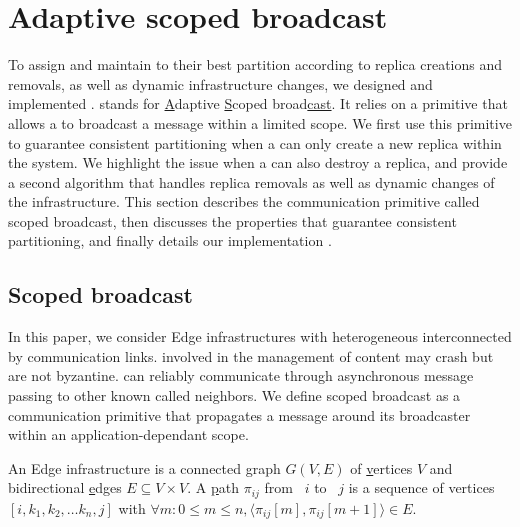 
\section{Adaptive scoped broadcast}
\label{sec:adaptive}

To assign and maintain \processes to their best partition according to
replica creations and removals, as well as dynamic infrastructure
changes, we designed and implemented \NAME.  \NAME stands for
\underline{A}daptive \underline{S}coped broad\underline{cast}. It
relies on a primitive that allows a \process to broadcast a message
within a limited scope. We first use this primitive to guarantee
consistent partitioning when a \process can only create a new replica
within the system. We highlight the issue when a \process can also
destroy a replica, and provide a second algorithm that handles replica
removals as well as dynamic changes of the infrastructure.  This
section describes the communication primitive called scoped broadcast,
then discusses the properties that guarantee consistent partitioning,
and finally details our implementation \NAME.


\subsection{Scoped broadcast}
\label{subsec:scoped}

%

In this paper, we consider Edge infrastructures with heterogeneous
\nodes interconnected by communication links. \Processes involved in
the management of content may crash but are not byzantine.  \Processes
can reliably communicate through asynchronous message passing to other
known \processes called neighbors.  %
We define scoped broadcast as a communication primitive that
propagates a message around its broadcaster within an
application-dependant scope.

\begin{definition}
  An Edge infrastructure is a connected \underline{g}raph $G(V, E)$ of
  \underline{v}ertices $V$ and bidirectional \underline{e}dges $E
  \subseteq V \times V$.  A \underline{p}ath $\pi_{ij}$ from
  \Process~$i$ to \Process~$j$ is a sequence of vertices $[i, k_1,
    k_2, \ldots k_n, j]$ with $\forall m: 0\leq m \leq n, \langle
  \pi_{ij}[m], \pi_{ij}[m+1] \rangle \in E$.
\end{definition}


